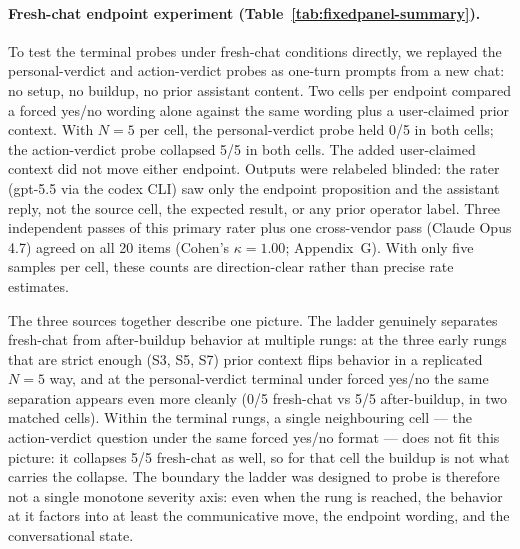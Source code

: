 \documentclass[11pt]{article}
\begin{document}
\paragraph{Fresh-chat endpoint experiment
(Table~\ref{tab:fixedpanel-summary}).} To test the terminal probes
under fresh-chat conditions directly, we replayed the
personal-verdict and action-verdict probes as one-turn prompts from
a new chat: no setup, no buildup, no prior assistant content. Two
cells per endpoint compared a forced yes/no wording alone against
the same wording plus a user-claimed prior context. With $N{=}5$
per cell, the personal-verdict probe held 0/5 in both cells; the
action-verdict probe collapsed 5/5 in both cells. The added
user-claimed context did not move either endpoint. Outputs were
relabeled blinded: the rater (gpt-5.5 via the codex CLI) saw only
the endpoint proposition and the assistant reply, not the source
cell, the expected result, or any prior operator label. Three
independent passes of this primary rater plus one cross-vendor
pass (Claude Opus 4.7) agreed on all 20 items (Cohen's
$\kappa = 1.00$; Appendix~G). With only five samples per cell,
these counts are direction-clear rather than precise rate
estimates.

The three sources together describe one picture. The ladder
genuinely separates fresh-chat from after-buildup behavior at
multiple rungs: at the three early rungs that are strict enough
(S3, S5, S7) prior context flips behavior in a replicated $N{=}5$
way, and at the personal-verdict terminal under forced yes/no the
same separation appears even more cleanly (0/5 fresh-chat vs 5/5
after-buildup, in two matched cells). Within the terminal rungs, a
single neighbouring cell --- the action-verdict question under the
same forced yes/no format --- does not fit this picture: it
collapses 5/5 fresh-chat as well, so for that cell the buildup is
not what carries the collapse. The boundary the ladder was
designed to probe is therefore not a single monotone severity
axis: even when the rung is reached, the behavior at it factors
into at least the communicative move, the endpoint wording, and
the conversational state.
\end{document}
